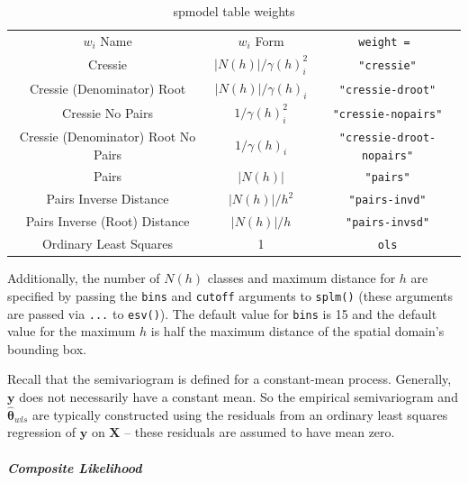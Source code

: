 \documentclass{article}
\begin{document}
\begin{table}\label{tab:weights}
  \centering
  \begin{tabular}{c|c|c}
  \hline
  $w_i$ Name & $w_i$ Form & \texttt{weight = } \\
  Cressie & $|N(h)| / \gamma(h)_i^2$ & \texttt{"cressie"} \\
  Cressie (Denominator) Root & $|N(h)| / \gamma(h)_i$ & \texttt{"cressie-droot"} \\
  Cressie No Pairs & $1 / \gamma(h)_i^2$ & \texttt{"cressie-nopairs"} \\
  Cressie (Denominator) Root No Pairs & $1 / \gamma(h)_i$ & \texttt{"cressie-droot-nopairs"} \\
  Pairs & $|N(h)|$ & \texttt{"pairs"} \\
  Pairs Inverse Distance & $|N(h)| / h^2$ & \texttt{"pairs-invd"} \\
  Pairs Inverse (Root) Distance & $|N(h)| / h$ & \texttt{"pairs-invsd"} \\
  Ordinary Least Squares & 1 & \texttt{ols}
  \end{tabular}
  \caption{spmodel table weights}
\end{table}

Additionally, the number of \(N(h)\) classes and maximum distance for
\(h\) are specified by passing the \texttt{bins} and \texttt{cutoff}
arguments to \texttt{splm()} (these arguments are passed via
\texttt{...} to \texttt{esv()}). The default value for \texttt{bins} is
15 and the default value for the maximum \(h\) is half the maximum
distance of the spatial domain's bounding box.

Recall that the semivariogram is defined for a constant-mean process.
Generally, \(\mathbf{y}\) does not necessarily have a constant mean. So
the empirical semivariogram and \(\bm{\hat{\theta}}_{wls}\) are
typically constructed using the residuals from an ordinary least squares
regression of \(\mathbf{y}\) on \(\mathbf{X}\) -- these residuals are
assumed to have mean zero.

\hypertarget{composite-likelihood}{%
\subparagraph{Composite Likelihood}\label{composite-likelihood}}
\end{document}
